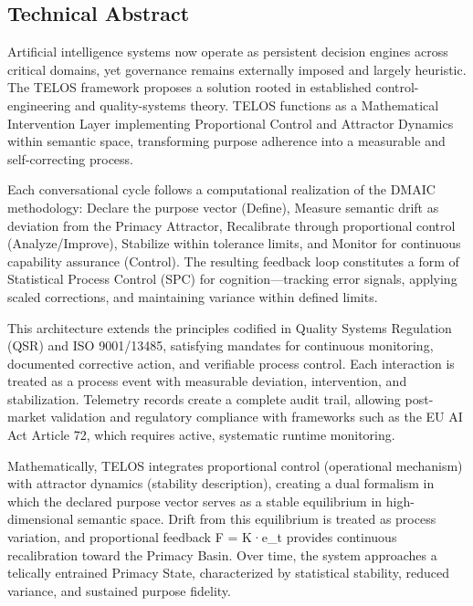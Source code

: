 \subsection{Technical Abstract}\label{technical-abstract}

Artificial intelligence systems now operate as persistent decision
engines across critical domains, yet governance remains externally
imposed and largely heuristic. The TELOS framework proposes a solution
rooted in established control-engineering and quality-systems theory.
TELOS functions as a Mathematical Intervention Layer implementing
Proportional Control and Attractor Dynamics within semantic space,
transforming purpose adherence into a measurable and self-correcting
process.

Each conversational cycle follows a computational realization of the
DMAIC methodology: Declare the purpose vector (Define), Measure semantic
drift as deviation from the Primacy Attractor, Recalibrate through
proportional control (Analyze/Improve), Stabilize within tolerance
limits, and Monitor for continuous capability assurance (Control). The
resulting feedback loop constitutes a form of Statistical Process
Control (SPC) for cognition---tracking error signals, applying scaled
corrections, and maintaining variance within defined limits.

This architecture extends the principles codified in Quality Systems
Regulation (QSR) and ISO 9001/13485, satisfying mandates for continuous
monitoring, documented corrective action, and verifiable process
control. Each interaction is treated as a process event with measurable
deviation, intervention, and stabilization. Telemetry records create a
complete audit trail, allowing post-market validation and regulatory
compliance with frameworks such as the EU AI Act Article 72, which
requires active, systematic runtime monitoring.

Mathematically, TELOS integrates proportional control (operational
mechanism) with attractor dynamics (stability description), creating a
dual formalism in which the declared purpose vector serves as a stable
equilibrium in high-dimensional semantic space. Drift from this
equilibrium is treated as process variation, and proportional feedback F
= K·e\_t provides continuous recalibration toward the Primacy Basin.
Over time, the system approaches a telically entrained Primacy State,
characterized by statistical stability, reduced variance, and sustained
purpose fidelity.

